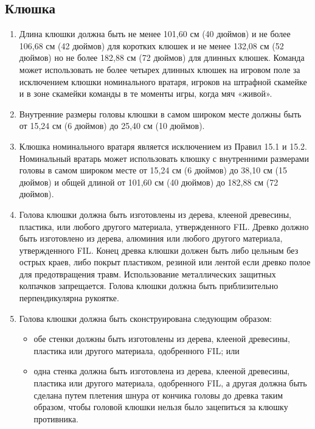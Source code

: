 \documentclass[../main.tex]{subfiles}
\begin{document}
\subsection{Клюшка}
\begin{enumerate}
    \item Длина клюшки должна быть не менее 101,60 см (40 дюймов) и не более 106,68 см (42 дюймов) для коротких клюшек и не менее 132,08 см (52 дюймов) но не более 182,88 см (72 дюймов) для длинных клюшек.\newline 
    Команда может использовать не более четырех длинных клюшек на игровом поле за исключением клюшки номинального вратаря, игроков на штрафной скамейке и в зоне скамейки команды в те моменты игры, когда мяч «живой».
    \item Внутренние размеры головы клюшки в самом широком месте должны быть от 15,24 см (6 дюймов) до 25,40 см (10 дюймов).
    \item Клюшка номинального вратаря является исключением из Правил 15.1 и 15.2. Номинальный вратарь может использовать клюшку с внутренними размерами головы в самом широком месте от 15,24 см (6 дюймов) до 38,10 см (15 дюймов) и общей длиной от 101,60 см (40 дюймов) до 182,88 см (72 дюймов).
    \item Голова клюшки должна быть изготовлены из дерева, клееной древесины, пластика, или любого другого материала, утвержденного FIL. Древко должно быть изготовлено из дерева, алюминия или любого другого материала, утвержденного FIL.\newline
    Конец древка клюшки должен быть либо цельным без острых краев, либо покрыт пластиком, резиной или лентой если древко полое для предотвращения травм.
    Использование металлических защитных колпачков запрещается.\newline
    Голова клюшки должна быть приблизительно перпендикулярна рукоятке.
    \item Голова клюшки должна быть сконструирована следующим образом:
    \begin{itemize}
        \item обе стенки должны быть изготовлены из дерева, клееной древесины, пластика или другого материала, одобренного FIL; или
        \item одна стенка должна быть изготовлена из дерева, клееной древесины, пластика или другого материала, одобренного FIL, а другая должна быть сделана путем плетения шнура от кончика головы до древка таким образом, чтобы головой клюшки нельзя было зацепиться за клюшку противника.

\end{itemize}
\end{enumerate}
\end{document}
